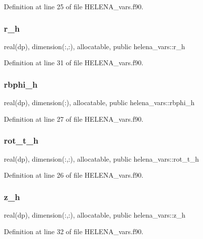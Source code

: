 Definition at line 25 of file H\+E\+L\+E\+N\+A\+\_\+vars.\+f90.

\mbox{\label{namespacehelena__vars_a0d157eace0479c9b8cbd4de9495f9775}} 
\subsubsection{\texorpdfstring{r\+\_\+h}{r\_h}}
{\footnotesize\ttfamily real(dp), dimension(\+:,\+:), allocatable, public helena\+\_\+vars\+::r\+\_\+h}



Definition at line 31 of file H\+E\+L\+E\+N\+A\+\_\+vars.\+f90.

\mbox{\label{namespacehelena__vars_aff62b635308558649bf727ac93fb7fea}} 
\subsubsection{\texorpdfstring{rbphi\+\_\+h}{rbphi\_h}}
{\footnotesize\ttfamily real(dp), dimension(\+:), allocatable, public helena\+\_\+vars\+::rbphi\+\_\+h}



Definition at line 27 of file H\+E\+L\+E\+N\+A\+\_\+vars.\+f90.

\mbox{\label{namespacehelena__vars_ae54b26f364e5cc4da39bbb01807e0da1}} 
\subsubsection{\texorpdfstring{rot\+\_\+t\+\_\+h}{rot\_t\_h}}
{\footnotesize\ttfamily real(dp), dimension(\+:,\+:), allocatable, public helena\+\_\+vars\+::rot\+\_\+t\+\_\+h}



Definition at line 26 of file H\+E\+L\+E\+N\+A\+\_\+vars.\+f90.

\mbox{\label{namespacehelena__vars_a41e897edb2a8b34fa7bde28ff57d012a}} 
\subsubsection{\texorpdfstring{z\+\_\+h}{z\_h}}
{\footnotesize\ttfamily real(dp), dimension(\+:,\+:), allocatable, public helena\+\_\+vars\+::z\+\_\+h}



Definition at line 32 of file H\+E\+L\+E\+N\+A\+\_\+vars.\+f90.

